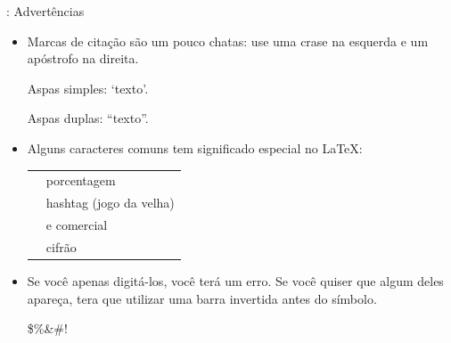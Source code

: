 \documentclass{beamer}
\begin{document}
\begin{frame}[fragile]{\insertsubsection{}: Advertências}
\small
\begin{itemize}
\item Marcas de citação são um pouco chatas: use uma
crase \keystroke{\`{}} na esquerda e um apóstrofo 
\keystroke{\'{}} na direita.
\begin{exampletwouptiny}
Aspas simples: `texto'.

Aspas duplas: ``texto''.
\end{exampletwouptiny}

\item Alguns caracteres comuns tem significado especial no  \LaTeX:\\[1ex]
\begin{tabular}{cl}
\keystrokebftt{\%} & porcentagem              \\
\keystrokebftt{\#} & hashtag (jogo da velha) \\
\keystrokebftt{\&} & e comercial                 \\
\keystrokebftt{\$} & cifrão               \\
\end{tabular}
\item Se você apenas digitá-los, você terá um erro. Se você quiser que algum
deles apareça, tera que utilizar uma barra invertida antes do símbolo.
\begin{exampletwoup}
\$\%\&\#!
\end{exampletwoup}
\end{itemize}
\end{frame}
\end{document}
